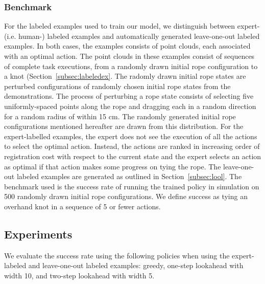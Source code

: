 \subsubsection{Benchmark}
For the labeled examples  used to train our \mmql{} model, we distinguish between expert- (i.e. human-) labeled examples and automatically generated leave-one-out labeled examples.
In both cases, the examples consists of point clouds, each associated with an optimal action.
The point clouds in these examples consist of sequences of complete task executions, from a randomly drawn initial rope configuration to a knot (Section~\ref{subsec:labeledex}.
The radomly drawn initial rope states are perturbed configurations of randomly chosen initial rope states from the demonstrations.
The process of perturbing a rope state consists of selecting five uniformly-spaced points along the rope and dragging each in a random direction for a random radius of within 15 cm.
The randomly generated initial rope configurations mentioned hereafter are drawn from this distribution.
For the expert-labelled examples, the expert does not see the execution of all the actions to select the optimal action.
Instead, the actions are ranked in increasing order of registration cost with respect to the current state and the expert selects an action as optimal if that action makes some progress on tying the rope.
The leave-one-out labeled examples are generated as outlined in Section~\ref{subsec:lool}. 
The benchmark used is the success rate of running the trained policy in simulation on 500 randomly drawn initial rope configurations. 
We define success as tying an overhand knot in a sequence of 5 or fewer actions.

\subsection{Experiments}
We evaluate the success rate using the following policies when using the expert-labeled and leave-one-out labeled examples: greedy, one-step lookahead with width 10, and two-step lookahead with width 5.
